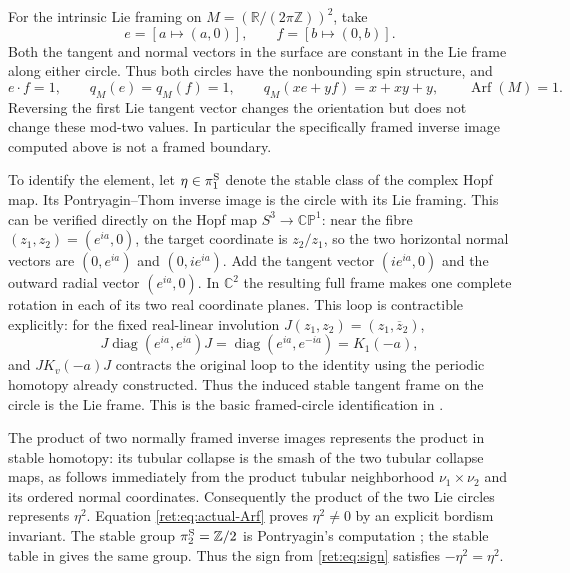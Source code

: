 \documentclass[11pt]{article}
\theoremstyle{definition}
\begin{document}
For the intrinsic Lie framing on
\(M=(\mathbb R/(2\pi\mathbb Z))^2\), take
\[
 e=[a\mapsto(a,0)],\qquad f=[b\mapsto(0,b)].
\]
Both the tangent and normal vectors in the surface are constant in
the Lie frame along either circle.  Thus both circles have the
nonbounding spin structure, and
\begin{equation}
 e\mathbin{\cdot}f=1,\qquad q_M(e)=q_M(f)=1,
 \qquad q_M(xe+yf)=x+xy+y,
 \qquad \operatorname{Arf}(M)=1.
 \label{ret:eq:actual-Arf}
\end{equation}
Reversing the first Lie tangent vector changes the orientation but
does not change these mod-two values.  In particular the
specifically framed inverse image computed above is not a framed
boundary.

To identify the element, let \(\eta\in\pi_1^{\rm S}\) denote the
stable class of the complex Hopf map.  Its Pontryagin--Thom inverse
image is the circle with its Lie framing.  This can be verified
directly on the Hopf map \(S^3\to\mathbb{CP}^1\): near the fibre
\((z_1,z_2)=(e^{ia},0)\), the target coordinate is \(z_2/z_1\), so
the two horizontal normal vectors are \((0,e^{ia})\) and
\((0,ie^{ia})\).  Add the tangent vector \((ie^{ia},0)\) and the
outward radial vector \((e^{ia},0)\).  In \(\mathbb C^2\) the resulting
full frame makes one complete rotation in each of its two real
coordinate planes.  This loop is contractible explicitly: for the
fixed real-linear involution \(J(z_1,z_2)=(z_1,\overline z_2)\),
\[
 J\operatorname{diag}(e^{ia},e^{ia})J=\operatorname{diag}(e^{ia},e^{-ia})=K_1(-a),
\]
and \(JK_v(-a)J\) contracts the original loop to the identity using
the periodic homotopy already constructed.  Thus the induced stable
tangent frame on the circle is the Lie frame.  This is the basic
framed-circle identification in \cite{retbib:Pontryagin1955}.

The product of two normally framed inverse images represents the
product in stable homotopy: its tubular collapse is the smash of
the two tubular collapse maps, as follows immediately from the
product tubular neighborhood \(\nu_1\times\nu_2\) and its ordered
normal coordinates.  Consequently the product of the two Lie
circles represents \(\eta^2\).  Equation \eqref{ret:eq:actual-Arf}
proves \(\eta^2\ne0\) by an explicit bordism invariant.  The
stable group \(\pi_2^{\rm S}=\mathbb Z/2\) is Pontryagin's computation
\cite{retbib:Pontryagin1950,retbib:Pontryagin1955}; the stable table in
\cite[pp.~384--385]{retbib:Hatcher} gives the same group.  Thus the sign from
\eqref{ret:eq:sign} satisfies \(-\eta^2=\eta^2\).
\end{document}
